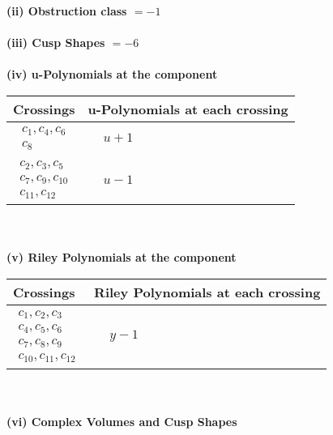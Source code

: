 \documentclass[1p]{elsarticle_modified}
\theoremstyle{definition}
\begin{document}
\flushleft \textbf{(ii) Obstruction class $= -1$}\\~\\
\flushleft \textbf{(iii) Cusp Shapes $= -6$}\\~\\
\newpage\renewcommand{\arraystretch}{1}
\flushleft \textbf{(iv) u-Polynomials at the component}\newline \\
\begin{tabular}{m{50pt}|m{274pt}}
Crossings & \hspace{64pt}u-Polynomials at each crossing \\
\hline $$\begin{aligned}c_{1},c_{4},c_{6}\\c_{8}\end{aligned}$$&$\begin{aligned}
&u+1
\end{aligned}$\\
\hline $$\begin{aligned}c_{2},c_{3},c_{5}\\c_{7},c_{9},c_{10}\\c_{11},c_{12}\end{aligned}$$&$\begin{aligned}
&u-1
\end{aligned}$\\
\hline
\end{tabular}\\~\\
\newpage\renewcommand{\arraystretch}{1}
\flushleft \textbf{(v) Riley Polynomials at the component}\newline \\
\begin{tabular}{m{50pt}|m{274pt}}
Crossings & \hspace{64pt}Riley Polynomials at each crossing \\
\hline $$\begin{aligned}c_{1},c_{2},c_{3}\\c_{4},c_{5},c_{6}\\c_{7},c_{8},c_{9}\\c_{10},c_{11},c_{12}\end{aligned}$$&$\begin{aligned}
&y-1
\end{aligned}$\\
\hline
\end{tabular}\\~\\
\newpage\flushleft \textbf{(vi) Complex Volumes and Cusp Shapes}
\end{document}
